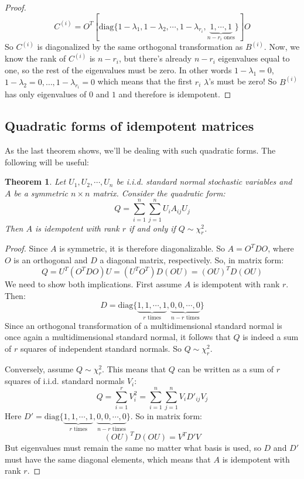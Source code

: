 \documentclass[12pt, a4paper]{article}
\newtheorem{theorem}{Theorem}
\begin{document}
\begin{proof}
\begin{equation}
C^{(i)}=O^T\left[\textrm{diag}\{1-\lambda_1,1-\lambda_2,\cdots,1-\lambda_{r_i},\underbrace{1,\cdots,1}_{n-r_i\textrm{ ones}}\}\right]O
\end{equation}
So $C^{(i)}$ is diagonalized by the same orthogonal transformation as $B^{(i)}$. Now, we know the rank of $C^{(i)}$ is $n-r_i$, but there's already $n-r_i$ eigenvalues equal to one, so the rest of the eigenvalues must be zero. In other words $1-\lambda_1=0$, $1-\lambda_2=0, \ldots, 1-\lambda_{r_i}=0$ which means that the first $r_i$ $\lambda$'s must be zero! So $B^{(i)}$ has only eigenvalues of $0$ and $1$ and therefore is idempotent.
\end{proof}

\subsection{Quadratic forms of idempotent matrices}
As the last theorem shows, we'll be dealing with such quadratic forms. The following will be useful:
\begin{theorem}
\label{quadform}
Let $U_1,U_2,\cdots, U_n$ be i.i.d. standard normal stochastic variables and $A$ be a symmetric $n\times n$ matrix. Consider the quadratic form:
\begin{equation}
Q=\sum_{i=1}^n\sum_{j=1}^n U_i A_{ij} U_j
\end{equation}
Then $A$ is idempotent with rank $r$ if and only if $Q\sim\chi^2_r$.
\end{theorem}
\begin{proof}
Since $A$ is symmetric, it is therefore diagonalizable. So $A=O^TDO$, where $O$ is an orthogonal and $D$ a diagonal matrix, respectively. So, in matrix form:
\begin{equation}
Q=U^T(O^TDO)U=(U^TO^T)D(OU)=(OU)^T D(OU)
\end{equation}
We need to show both implications. First assume $A$ is idempotent with rank $r$. Then:
\begin{equation}
D=\textrm{diag}\{\underbrace{1, 1, \cdots, 1}_{r\textrm{ times}},\underbrace{0, 0,\cdots, 0}_{n-r\textrm{ times}}\}
\end{equation}
Since an orthogonal transformation of a multidimensional standard normal is once again a multidimensional standard normal, it follows that $Q$ is indeed a sum of $r$ squares of independent standard normals. So $Q\sim\chi^2_r$.\par
Conversely, assume $Q\sim\chi^2_r$. This means that $Q$ can be written as a sum of $r$ squares of i.i.d. standard normals $V_i$:
\begin{equation}
Q=\sum_{i=1}^r V_i^2=\sum_{i=1}^n\sum_{j=1}^n V_i D'_{ij} V_j
\end{equation}
Here $D'=\textrm{diag}\{\underbrace{1, 1, \cdots, 1}_{r\textrm{ times}},\underbrace{0, 0,\cdots, 0}_{n-r\textrm{ times}}\}$. 
So in matrix form:
\begin{equation}
(OU)^T D(OU)=V^T D' V
\end{equation}
But eigenvalues must remain the same no matter what basis is used, so $D$ and $D'$ must have the same diagonal elements, which means that $A$ is idempotent with rank $r$.
\end{proof}
\end{document}
